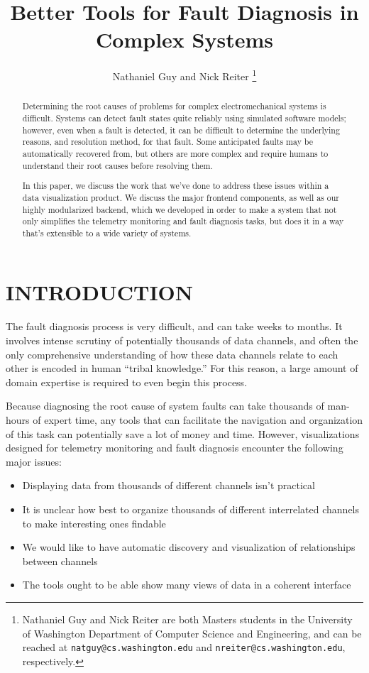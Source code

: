 \documentclass[letterpaper, 10 pt, conference]{ieeeconf}  %
\title{\LARGE \bf
Better Tools for Fault Diagnosis in Complex Systems\\
}
\author{Nathaniel Guy and Nick Reiter%
\thanks{Nathaniel Guy and Nick Reiter are both Masters students in the University of Washington Department of Computer Science and Engineering, and can be reached at {\tt\small natguy@cs.washington.edu} and {\tt\small nreiter@cs.washington.edu}, respectively.}%
}
\begin{document}
\maketitle
\thispagestyle{empty}
\pagestyle{empty}

\begin{abstract}

Determining the root causes of problems for complex electromechanical systems is difficult. Systems can detect fault states quite reliably using simulated software models; however, even when a fault is detected, it can be difficult to determine the underlying reasons, and resolution method, for that fault. Some anticipated faults may be automatically recovered from, but others are more complex and require humans to understand their root causes before resolving them.

In this paper, we discuss the work that we've done to address these issues within a data visualization product. We discuss the major frontend components, as well as our highly modularized backend, which we developed in order to make a system that not only simplifies the telemetry monitoring and fault diagnosis tasks, but does it in a way that's extensible to a wide variety of systems.

\end{abstract}

\section{INTRODUCTION}

The fault diagnosis process is very difficult, and can take weeks to months. It involves intense scrutiny of potentially thousands of data channels, and often the only comprehensive understanding of how these data channels relate to each other is encoded in human “tribal knowledge.” For this reason, a large amount of domain expertise is required to even begin this process.

Because diagnosing the root cause of system faults can take thousands of man-hours of expert time, any tools that can facilitate the navigation and organization of this task can potentially save a lot of money and time. However, visualizations designed for telemetry monitoring and fault diagnosis encounter the following major issues:

\begin{itemize}
  \item Displaying data from thousands of different channels isn't practical
  \item It is unclear how best to organize thousands of different interrelated channels to make interesting ones findable
  \item We would like to have automatic discovery and visualization of relationships between channels
  \item The tools ought to be able show many views of data in a coherent interface
\end{itemize}
\end{document}
